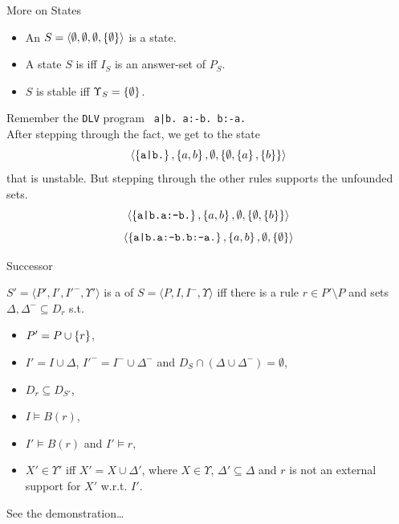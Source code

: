 \documentclass{beamer}
\begin{document}
\begin{frame}{More on States}

	\begin{itemize}
		\item An \emph{} $S = \langle \emptyset, \emptyset, \emptyset, \left\{{\emptyset}\right\} \rangle$ is a state.
		\item A state $S$ is \emph{} iff $I_S$ is an answer-set of $P_S$.
		\item $S$ is stable iff $\Upsilon_S = \left\{{\emptyset}\right\}$.
	\end{itemize}

	\pause

	\begin{example}
	Remember the \texttt{DLV} program \texttt{ a|b. a:-b. b:-a.}\\
	\pause
	After stepping through the fact, we get to the state
	$$\langle \left\{{\texttt{a|b.}}\right\}, \left\{{a,b}\right\}, \emptyset, \left\{{\emptyset,\left\{{a}\right\},\left\{{b}\right\}}\right\} \rangle$$
	that is unstable.
	\pause
	But stepping through the other rules supports the unfounded sets.
	$$\langle \left\{{\texttt{a|b.a:-b.}}\right\}, \left\{{a,b}\right\}, \emptyset, \left\{{\emptyset,\left\{{b}\right\}}\right\} \rangle$$
	$$\langle \left\{{\texttt{a|b.a:-b.b:-a.}}\right\}, \left\{{a,b}\right\}, \emptyset, \left\{{\emptyset}\right\} \rangle$$
	\end{example}

\end{frame}

\begin{frame}{Successor}

	\begin{definition}[successor]
	$S' = \langle P', I', I'^-, \Upsilon' \rangle$ is a \emph{} of $S = \langle P, I, I^-, \Upsilon \rangle$ iff\newline
	there is a rule $r \in P' \setminus P$ and sets $\Delta, \Delta^- \subseteq D_r$ s.t.
	\begin{itemize}
		\item $P' = P \cup \left\{{r}\right\}$,
		\item $I' = I \cup \Delta$, $I'^- = I^- \cup \Delta^-$ and $D_S \cap (\Delta \cup \Delta^-) = \emptyset$,
		\item $D_r \subseteq D_{S'}$,
		\item $I \models B(r)$,
		\item $I' \models B(r)$ and $I' \models r$,
		\item $X' \in \Upsilon'$ iff $X' = X \cup \Delta'$, where
		$X \in \Upsilon$, $\Delta' \subseteq \Delta$ and
		$r$ is not an external support for $X'$ w.r.t. $I'$.
	\end{itemize}
	\end{definition}

	\pause

	\begin{example}[s]
	See the demonstration\ldots
	\end{example}

\end{frame}
\end{document}
